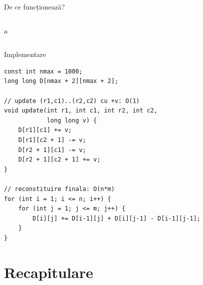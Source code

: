 \documentclass{beamer}
\begin{document}
\begin{frame}[shrink]{De ce funcționează?}
\begin{columns}[T]
\begin{center}
    \smallskip

    {\footnotesize $a$}
    \end{center}

  \end{columns}
\end{frame}

\begin{frame}{Implementare}
  \begin{lstlisting}
const int nmax = 1000;
long long D[nmax + 2][nmax + 2];

// update (r1,c1)..(r2,c2) cu +v: O(1)
void update(int r1, int c1, int r2, int c2,
            long long v) {
    D[r1][c1] += v;
    D[r1][c2 + 1] -= v;
    D[r2 + 1][c1] -= v;
    D[r2 + 1][c2 + 1] += v;
}

// reconstituire finala: O(n*m)
for (int i = 1; i <= n; i++) {
    for (int j = 1; j <= m; j++) {
        D[i][j] += D[i-1][j] + D[i][j-1] - D[i-1][j-1];
    }
}
  \end{lstlisting}
\end{frame}

\section{Recapitulare}
\end{document}
